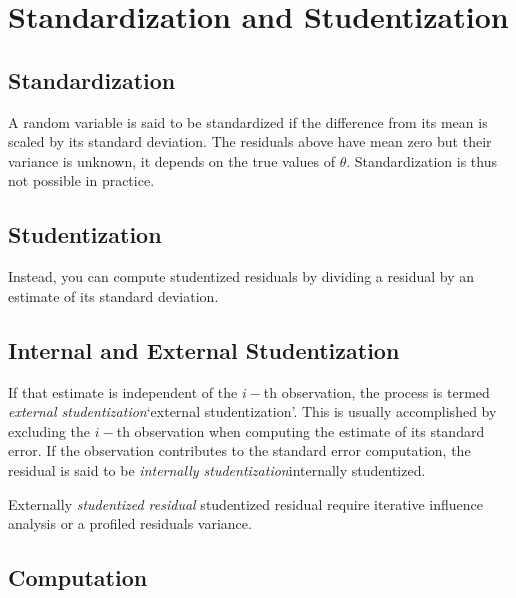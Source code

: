 \newpage
\section{Standardization and Studentization}
\subsection{Standardization} %

A random variable is said to be standardized if the difference from its mean is scaled by its standard deviation. The residuals above have mean zero but their variance is unknown, it depends on the true values of $\theta$. Standardization is thus not possible in practice.

\subsection{Studentization} %
Instead, you can compute studentized residuals by dividing a residual by an estimate of its standard deviation. 

\subsection{Internal and External Studentization} %
If that estimate is independent of the $i-$th observation, the process is termed \emph{external studentization}`external studentization'. This is usually accomplished by excluding the $i-$th observation when computing the estimate of its standard error. If the observation contributes to the
standard error computation, the residual is said to be \emph{internally studentization}internally studentized.

Externally \emph{studentized residual} studentized residual require iterative influence analysis or a profiled residuals variance.

\subsection{Computation}%


